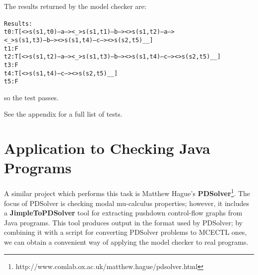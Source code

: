 \documentclass[11pt]{article}
\theoremstyle{definition}
\begin{document}
The results returned by the model checker are:
\footnotesize
\begin{alltt}
Results: {
   t0: T     [ <> s(s1,t0) --a--> <_> s(s1,t1) --b--> <> s(s1,t2) --a--> 
               <_> s(s1,t3) --b--> <> s(s1,t4) --c--> <> s(s2,t5)__ ]
   t1: F
   t2: T     [ <> s(s1,t2) --a--> <_> s(s1,t3) --b--> <> s(s1,t4) --c--> <> s(s2,t5)__ ]
   t3: F
   t4: T     [ <> s(s1,t4) --c--> <> s(s2,t5)__ ]
   t5: F
}
\end{alltt}
\normalsize
so the test passes.

See the appendix for a full list of tests.

\section{Application to Checking Java Programs}

A similar project which performs this task is Matthew Hague's
\textbf{PDSolver}\footnote{
http://www.comlab.ox.ac.uk/matthew.hague/pdsolver.html}\cite{hague2010analysing}.
The focus of PDSolver is checking modal mu-calculus properties; however, it
includes a \textbf{JimpleToPDSolver} tool for extracting pushdown control-flow
graphs from Java programs. This tool produces output in the format used by
PDSolver; by combining it with a script for converting PDSolver problems to
MCECTL ones, we can obtain a convenient way of applying the model checker to
real programs.
\end{document}
